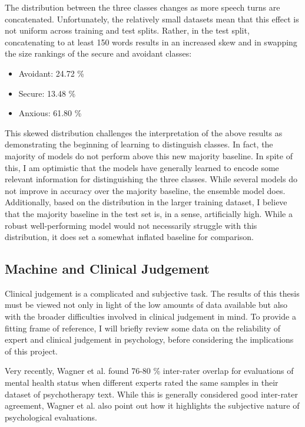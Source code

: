 \documentclass[12pt]{report}
\begin{document}
The distribution between the three classes changes as more speech turns are concatenated.
Unfortunately, the relatively small datasets mean that this effect is not uniform across training and test splits.
Rather, in the test split, concatenating to at least 150 words results in an increased skew and in swapping the size rankings of the secure and avoidant classes:
\begin{itemize}
    \item Avoidant: 24.72 \%
    \item Secure: 13.48 \%
    \item Anxious: 61.80 \%
\end{itemize}

This skewed distribution challenges the interpretation of the above results as demonstrating the beginning of learning to distinguish classes.
In fact, the majority of models do not perform above this new majority baseline.
In spite of this, I am optimistic that the models have generally learned to encode some relevant information for distinguishing the three classes.
While several models do not improve in accuracy over the majority baseline, the ensemble model does.
Additionally, based on the distribution in the larger training dataset, I believe that the majority baseline in the test set is, in a sense, artificially high.
While a robust well-performing model would not necessarily struggle with this distribution, it does set a somewhat inflated baseline for comparison.

\subsection{Machine and Clinical Judgement}
Clinical judgement is a complicated and subjective task.
The results of this thesis must be viewed not only in light of the low amounts of data available but also with the broader difficulties involved in clinical judgement in mind.
To provide a fitting frame of reference, I will briefly review some data on the reliability of expert and clinical judgement in psychology, before considering the implications of this project.

Very recently, Wagner et al. \citeyear{Wagner2023} found 76-80 \% inter-rater overlap for evaluations of mental health status when different experts rated the same samples in their dataset of psychotherapy text.
While this is generally considered good inter-rater agreement, Wagner et al. also point out how it highlights the subjective nature of psychological evaluations.
\end{document}
